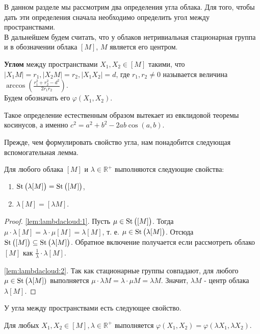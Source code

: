В данном разделе мы рассмотрим два определения угла облака. Для того, чтобы
дать эти определения сначала необходимо определить угол между пространствами.
\\
В дальнейшем будем считать, что у облаков нетривиальная стационарная группа и в
обозначении облака $ [M] $, $ M $ является его центром.
\begin{defin}
    \textbf{Углом} между пространствами $ X_1, X_2 \in [M] $ такими, что $ |X_1
    M| = r_1, | X_2 M | =r_2, |X_1 X_2| = d$, где $ r_1,
    r_2 \neq 0 $ называется величина $ \arccos \left(\frac{r_1^2 +
    r_{2}^2 - d^2}{2r_1r_2} \right)$.\\ Будем обозначать его $
    \varphi(X_1, X_2) $.
\end{defin}
\begin{remark}
    Такое определение естественным образом вытекает из евклидовой теоремы
    косинусов, а именно $ c^{2} = a^2 + b^2 - 2ab\cos (a,b) $.
\end{remark}
Прежде, чем формулировать свойство угла, нам понадобится следующая
вспомогательная лемма.
\begin{lemma}
    \label{lem:lambdacloud} Для любого облака \( [M] \) и \( \lambda
    \in\mathbb{R}^+ \) выполняются следующие свойства{\textup{:}}
    \begin{enumerate}
        \item \( \operatorname{St}\big(\lambda [M]\big) = \operatorname{St}\big([M]\big)\),
            \label{lem:lambdacloud:1}
        \item \( \lambda [M] = [\lambda M] \).\label{lem:lambdacloud:2}
    \end{enumerate}
\end{lemma}
\begin{proof}
    \ref{lem:lambdacloud:1}. Пусть \( \mu \in \operatorname{St}\big([M]\big) \). Тогда \( \mu
    \cdot \lambda [M] = \lambda \cdot \mu [M]= \lambda [M] \), т. е. \( \mu \in
    \operatorname{St}\big(\lambda [M]\big) \). Отсюда \( \operatorname{St}\big([M]\big) \subseteq
    \operatorname{St}\big(\lambda [M]\big) \). Обратное включение получается если рассмотреть
    облако \( [M] \) как \(\frac{1}{\lambda}\cdot \lambda [M] \). 

    \ref{lem:lambdacloud:2}. Так как стационарные группы совпадают, для любого
    \( \mu \in  \operatorname{St}\big(\lambda [M])\) выполняется \( \mu \cdot \lambda M =
        \lambda \cdot \mu M = \lambda M \). Значит, \( \lambda M \) - центр
        облака \( \lambda [M] \).
    \end{proof}
    У угла между пространствами есть следующее свойство.
    \begin{lemma}
        \label{lemmaAngleBetweenSpaces} Для любых \( X_1, X_2 \in [M], \lambda
        \in\mathbb{R}^+ \) выполняется \( \varphi (X_1, X_2) = \varphi (\lambda
        X_1,
        \lambda X_2) \).
    \end{lemma}
